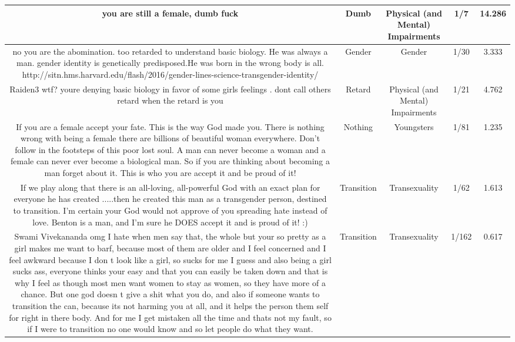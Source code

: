 \documentclass[11pt]{article}
\newlength\mylength
\begin{document}
\begin{center}
\begin{longtable}{|C{.40\mylength}|C{.30\mylength}|C{.15\mylength}|C{.15\mylength}|C{.15\mylength}|}
  you are still a female, dumb fuck  & Dumb & Physical (and Mental) Impairments & 1/7 & 14.286 \\  \hline
  no you are the abomination. too retarded to understand basic biology. He was always a man. gender identity is genetically predisposed.He was born in the wrong body is all. http://sitn.hms.harvard.edu/flash/2016/gender-lines-science-transgender-identity/  & Gender & Gender & 1/30 & 3.333 \\  \hline
  Raiden3 wtf? youre denying basic biology in favor of some girls  feelings . dont call others retard when the retard is you  & Retard & Physical (and Mental) Impairments & 1/21 & 4.762 \\  \hline
  If you are a female accept your fate. This is the way God made you. There is nothing wrong with being a female there are billions of beautiful woman everywhere.  Don't follow in the footsteps of this poor lost soul. A man can never become a woman and a female can never ever become a biological man. So if you are thinking about becoming a man forget about it. This is who you are accept it and be proud of it!  & Nothing & Youngsters & 1/81 & 1.235 \\  \hline
  If we play along that there is an all-loving, all-powerful God with an exact plan for everyone he has  created .....then he created this man as a transgender person, destined to transition. I'm certain your God would not approve of you spreading hate instead of love. Benton is a man, and I'm sure he DOES accept it and is proud of it! :)  & Transition & Transexuality & 1/62 & 1.613 \\  \hline
  Swami Vivekananda omg I hate when men say that, the whole  but your so pretty as a girl  makes me want to barf, because most of them are older and I feel concerned and I feel awkward because I don t look like a girl, so sucks for me I guess and also being a girl sucks ass, everyone thinks your easy and that you can easily be taken down and that is why I feel as though most men want women to stay as women, so they have more of a chance. But one god doesn t give a shit what you do, and also if someone wants to transition the can, because its not harming you at all, and it helps the person them self for right in there body. And for me I get mistaken all the time and thats not my fault, so if I were to transition no one would know and so let people do what they want.  & Transition & Transexuality & 1/162 & 0.617 \\  \hline

\end{longtable}
\end{center}
\end{document}
